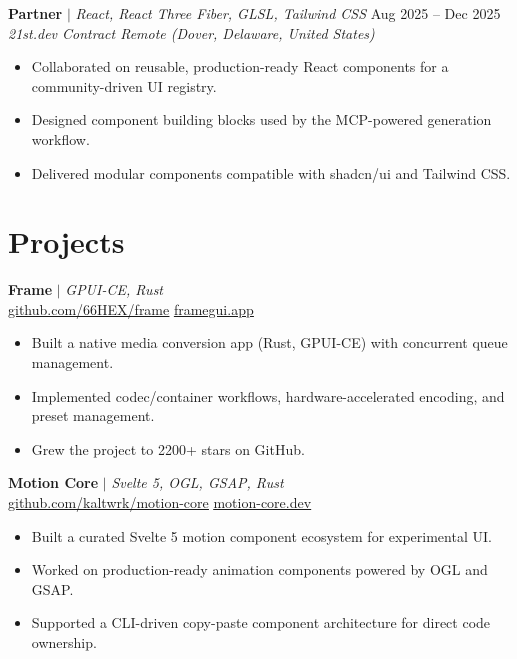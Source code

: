\documentclass[10pt,a4paper]{article}
\let\oldhref\href
\renewcommand{\href}[2]{\oldhref{#1}{\uline{#2}}}
\begin{document}
\textbf{Partner} $|$ \textit{React, React Three Fiber, GLSL, Tailwind CSS} \hfill Aug 2025 -- Dec 2025\\
\textit{21st.dev \textbar{} Contract \textbar{} Remote (Dover, Delaware, United States)}
\begin{itemize}
  \item Collaborated on reusable, production-ready React components for a community-driven UI registry.
  \item Designed component building blocks used by the MCP-powered generation workflow.
  \item Delivered modular components compatible with shadcn/ui and Tailwind CSS.
\end{itemize}

\section{Projects}

\textbf{Frame} $|$ \textit{GPUI-CE, Rust} \hfill\\
\href{https://github.com/66HEX/frame}{github.com/66HEX/frame} \textbar{} \href{https://www.framegui.app/}{framegui.app}
\begin{itemize}
  \item Built a native media conversion app (Rust, GPUI-CE) with concurrent queue management.
  \item Implemented codec/container workflows, hardware-accelerated encoding, and preset management.
  \item Grew the project to 2200+ stars on GitHub.
\end{itemize}

\textbf{Motion Core} $|$ \textit{Svelte 5, OGL, GSAP, Rust} \hfill\\
\href{https://github.com/kaltwrk/motion-core}{github.com/kaltwrk/motion-core} \textbar{} \href{https://motion-core.dev/}{motion-core.dev}
\begin{itemize}
  \item Built a curated Svelte 5 motion component ecosystem for experimental UI.
  \item Worked on production-ready animation components powered by OGL and GSAP.
  \item Supported a CLI-driven copy-paste component architecture for direct code ownership.
\end{itemize}
\end{document}
